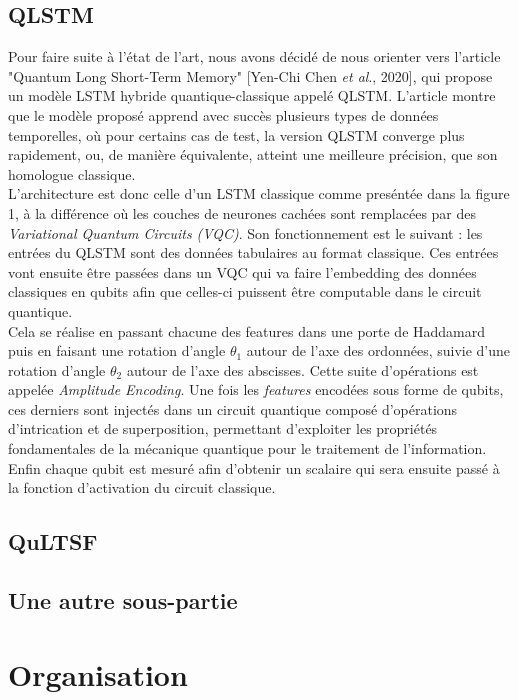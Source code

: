 \documentclass[11pt,a4paper]{article}
\begin{document}
\subsection{QLSTM}
Pour faire suite à l'état de l'art, nous avons décidé de nous orienter vers l'article "Quantum Long Short-Term Memory" [Yen-Chi Chen \emph{et al}., 2020], qui propose un modèle LSTM hybride quantique-classique appelé QLSTM. L'article montre que le modèle proposé apprend avec succès plusieurs types de données temporelles, où pour certains cas de test, la version QLSTM converge plus rapidement, ou, de manière équivalente, atteint une meilleure précision, que son homologue classique.\\L'architecture est donc celle d'un LSTM classique comme preséntée dans la figure 1, à la différence où les couches de neurones cachées sont remplacées par des \emph{Variational Quantum Circuits (VQC)}. Son fonctionnement est le suivant : les entrées du QLSTM sont des données tabulaires au format classique. Ces entrées vont ensuite être passées dans un VQC qui va faire l'embedding des données classiques en qubits afin que celles-ci puissent être computable dans le circuit quantique.\\Cela se réalise en passant chacune des features dans une porte de Haddamard puis en faisant une rotation d'angle \( \theta_{1} \) autour de l’axe des ordonnées, suivie d’une rotation d’angle \( \theta_{2} \) autour de l’axe des abscisses. Cette suite d’opérations est appelée \textit{Amplitude Encoding}.
Une fois les \textit{features} encodées sous forme de qubits, ces derniers sont injectés dans un circuit quantique composé d’opérations d’intrication et de superposition, permettant d’exploiter les propriétés fondamentales de la mécanique quantique pour le traitement de l’information. Enfin chaque qubit est mesuré afin d'obtenir un scalaire qui sera ensuite passé à la fonction d'activation du circuit classique.
\subsection{QuLTSF}
\subsection{Une autre sous-partie}
\lipsum[2]

\newpage
\section{Organisation}
\end{document}
